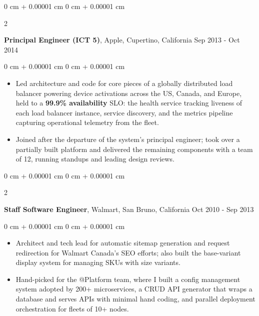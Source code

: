 \documentclass[10pt, letterpaper]{article}
\newenvironment{highlights}{
    \begin{itemize}[
        topsep=0.10 cm,
        parsep=0.10 cm,
        partopsep=0pt,
        itemsep=0pt,
        leftmargin=0 cm + 10pt
    ]
}{
    \end{itemize}
} %
\newenvironment{onecolentry}{
    \begin{adjustwidth}{
        0 cm + 0.00001 cm
    }{
        0 cm + 0.00001 cm
    }
}{
    \end{adjustwidth}
} %
\newenvironment{twocolentry}[2][]{
    \onecolentry
    \def\secondColumn{#2}
    \setcolumnwidth{\fill, 4.5 cm}
    \begin{paracol}{2}
}{
    \switchcolumn \raggedleft \secondColumn
    \end{paracol}
    \endonecolentry
} %
\begin{document}
        \vspace{0.15 cm}
        \begin{twocolentry}{
            Sep 2013 - Oct 2014
        }
            \textbf{Principal Engineer (ICT 5)}, Apple, Cupertino, California\end{twocolentry}
        \vspace{0.10 cm}
        \begin{onecolentry}
            \begin{highlights}
                \item Led architecture and code for core pieces of a globally distributed load balancer powering device activations across the US, Canada, and Europe, held to a \textbf{99.9\% availability} SLO: the health service tracking liveness of each load balancer instance, service discovery, and the metrics pipeline capturing operational telemetry from the fleet.
                \item Joined after the departure of the system's principal engineer; took over a partially built platform and delivered the remaining components with a team of 12, running standups and leading design reviews.
            \end{highlights}
        \end{onecolentry}

        \vspace{0.20 cm}
        \begin{twocolentry}{
            Oct 2010 - Sep 2013
        }
            \textbf{Staff Software Engineer}, Walmart, San Bruno, California\end{twocolentry}
        \vspace{0.10 cm}
        \begin{onecolentry}
            \begin{highlights}
                \item Architect and tech lead for automatic sitemap generation and request redirection for Walmart Canada's SEO efforts; also built the base-variant display system for managing SKUs with size variants.
                \item Hand-picked for the @Platform team, where I built a config management system adopted by 200+ microservices, a CRUD API generator that wraps a database and serves APIs with minimal hand coding, and parallel deployment orchestration for fleets of 10+ nodes.
            \end{highlights}
        \end{onecolentry}
\end{document}
